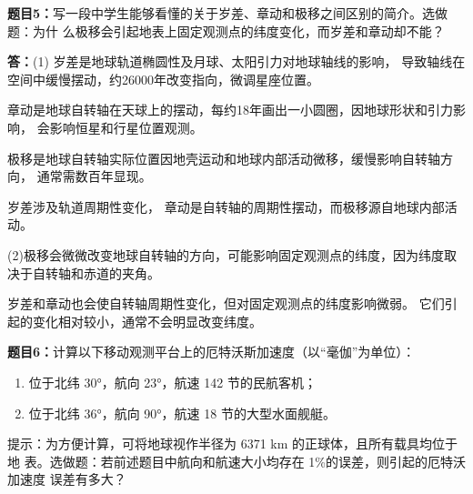 \documentclass[12pt,a4paper]{article}
\begin{document}
\vspace{10pt}
\noindent
{\bf 题目5：}写一段中学生能够看懂的关于岁差、章动和极移之间区别的简介。选做题：为什
么极移会引起地表上固定观测点的纬度变化，而岁差和章动却不能？

\vspace{5pt}
\noindent
{\bf 答：}(1)
    岁差是地球轨道椭圆性及月球、太阳引力对地球轴线的影响，
导致轴线在空间中缓慢摆动，约26000年改变指向，微调星座位置。

章动是地球自转轴在天球上的摆动，每约18年画出一小圆圈，因地球形状和引力影响，
会影响恒星和行星位置观测。

极移是地球自转轴实际位置因地壳运动和地球内部活动微移，缓慢影响自转轴方向，
通常需数百年显现。

岁差涉及轨道周期性变化，
章动是自转轴的周期性摆动，而极移源自地球内部活动。

(2)极移会微微改变地球自转轴的方向，可能影响固定观测点的纬度，因为纬度取决于自转轴和赤道的夹角。

岁差和章动也会使自转轴周期性变化，但对固定观测点的纬度影响微弱。
它们引起的变化相对较小，通常不会明显改变纬度。


\vspace{10pt}
\noindent
{\bf 题目6：}计算以下移动观测平台上的厄特沃斯加速度（以“毫伽”为单位）：
\begin{enumerate}[label=(\arabic*)] %
    \item 位于北纬 30°，航向 23°，航速 142 节的民航客机；
    \item 位于北纬 36°，航向 90°，航速 18 节的大型水面舰艇。
\end{enumerate}

\noindent
提示：为方便计算，可将地球视作半径为 6371 km 的正球体，且所有载具均位于地
表。选做题：若前述题目中航向和航速大小均存在 1\%的误差，则引起的厄特沃加速度
误差有多大？
\end{document}

